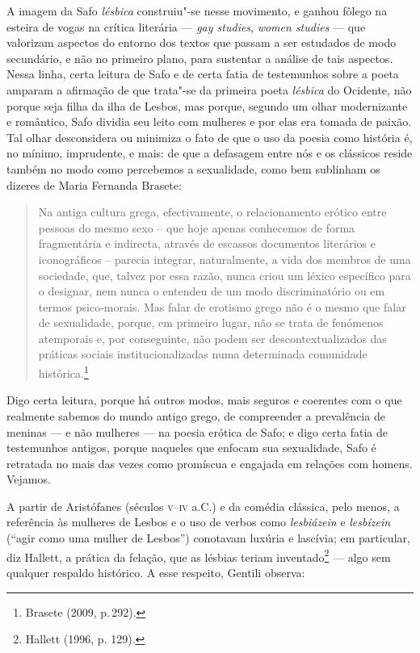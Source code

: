 A imagem da Safo \textit{lésbica} construiu"-se nesse movimento, e ganhou fôlego
na esteira de vogas na crítica literária --- \textit{gay studies}, \textit{women
studies} --- que valorizam aspectos do entorno dos textos que passam a ser
estudados de modo secundário, e não no primeiro plano, para sustentar a análise
de tais aspectos. Nessa linha, certa leitura de Safo e de certa fatia de
testemunhos sobre a poeta amparam a afirmação de que trata"-se da primeira poeta
\textit{lésbica} do Ocidente, não porque seja filha da ilha de Lesbos, mas
porque, segundo um olhar modernizante e romântico, Safo dividia seu leito com mulheres e por
elas era tomada de paixão.
Tal olhar desconsidera ou minimiza o fato de que o uso da poesia como história é, no mínimo, imprudente, e mais: de que a defasagem entre nós e os clássicos reside também no modo como percebemos a sexualidade, como bem sublinham os dizeres de Maria Fernanda Brasete:

\begin{quote}
Na antiga cultura grega, efectivamente, o relacionamento erótico entre pessoas do mesmo sexo – que hoje apenas conhecemos de forma fragmentária e indirecta, através de escassos documentos literários e iconográficos – parecia integrar, naturalmente, a vida dos membros de uma sociedade, que, talvez por essa razão, nunca criou um léxico específico para o designar, nem nunca o entendeu de um modo discriminatório ou em termos psico-morais. Mas falar de erotismo grego não é o mesmo que falar de sexualidade, porque, em primeiro lugar, não se trata de fenómenos atemporais e, por conseguinte, não podem ser descontextualizados das práticas sociais institucionalizadas numa determinada comunidade histórica.\footnote{Brasete (2009, p.\,292).}
\end{quote}


\noindent{}Digo certa leitura, porque há outros modos, mais
seguros e coerentes com o que realmente sabemos do mundo antigo grego, de
compreender a prevalência de meninas --- e não mulheres ---  na poesia erótica de Safo; e digo
certa fatia de testemunhos antigos, porque naqueles que enfocam sua
sexualidade, Safo é retratada no mais das vezes como promíscua e engajada em relações com homens. Vejamos. 

A partir de Aristófanes (séculos \textsc{v}--\textsc{iv} a.C.) e da comédia clássica, pelo menos, a
referência às mulheres de Lesbos e o uso de verbos como \textit{lesbiázein} e
\textit{lesbízein} (“agir como uma mulher de Lesbos”) conotavam luxúria e
lascívia; em particular, diz Hallett, a prática da
felação, que as lésbias teriam inventado\footnote{ Hallett (1996, p. 129).} --- algo sem qualquer respaldo
histórico. A esse respeito, Gentili observa: 

